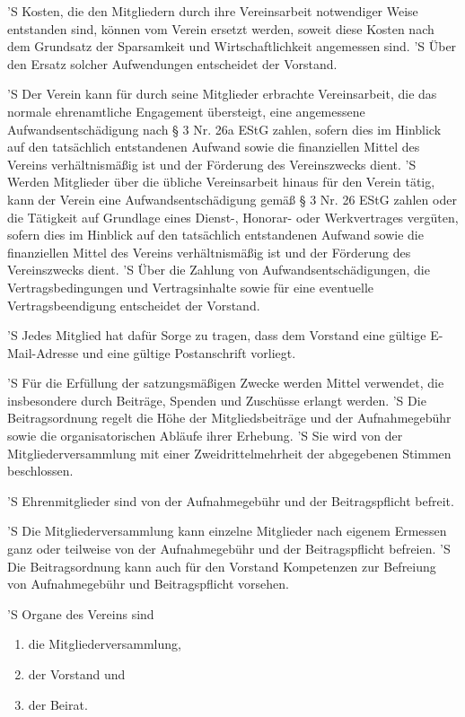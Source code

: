 \documentclass[a4paper,10pt]{scrreprt}
\begin{document}
\begin{contract}
'S Kosten, die den Mitgliedern durch ihre Vereinsarbeit notwendiger Weise
entstanden sind, können vom Verein ersetzt werden, soweit diese Kosten nach dem
Grundsatz der Sparsamkeit und Wirtschaftlichkeit angemessen sind.
'S Über den Ersatz solcher Aufwendungen entscheidet der Vorstand.

'S Der Verein kann für durch seine Mitglieder erbrachte Vereinsarbeit, die das
normale ehrenamtliche Engagement übersteigt, eine angemessene
Aufwandsentschädigung nach § 3 Nr. 26a EStG zahlen, sofern dies im Hinblick auf
den tatsächlich entstandenen Aufwand sowie die finanziellen Mittel des Vereins
verhältnismäßig ist und der Förderung des Vereinszwecks dient.
'S Werden Mitglieder über die übliche Vereinsarbeit hinaus für den Verein
tätig, kann der Verein eine Aufwandsentschädigung gemäß § 3 Nr. 26 EStG zahlen
oder die Tätigkeit auf Grundlage eines Dienst-, Honorar- oder Werkvertrages
vergüten, sofern dies im Hinblick auf den tatsächlich entstandenen Aufwand
sowie die finanziellen Mittel des Vereins verhältnismäßig ist und der Förderung
des Vereinszwecks dient.
'S Über die Zahlung von Aufwandsentschädigungen, die Vertragsbedingungen und
Vertragsinhalte sowie für eine eventuelle Vertragsbeendigung entscheidet der
Vorstand.

'S Jedes Mitglied hat dafür Sorge zu tragen, dass dem Vorstand eine gültige
E-Mail-Adresse und eine gültige Postanschrift vorliegt.


'S Für die Erfüllung der satzungsmäßigen Zwecke werden Mittel verwendet, die
insbesondere durch Beiträge, Spenden und Zuschüsse erlangt werden.
'S Die Beitragsordnung regelt die Höhe der Mitgliedsbeiträge und der
Aufnahmegebühr sowie die organisatorischen Abläufe ihrer Erhebung.
'S Sie wird von der Mitgliederversammlung mit einer Zweidrittelmehrheit der
abgegebenen Stimmen beschlossen.

'S Ehrenmitglieder sind von der Aufnahmegebühr und der Beitragspflicht befreit.

'S Die Mitgliederversammlung kann einzelne Mitglieder nach eigenem Ermessen
ganz oder teilweise von der Aufnahmegebühr und der Beitragspflicht befreien.
'S Die Beitragsordnung kann auch für den Vorstand Kompetenzen zur Befreiung von
Aufnahmegebühr und Beitragspflicht vorsehen.


'S Organe des Vereins sind
\begin{enumerate}
	\item die Mitgliederversammlung,
	\item der Vorstand und
	\item der Beirat.
\end{enumerate}


\end{contract}
\end{document}

